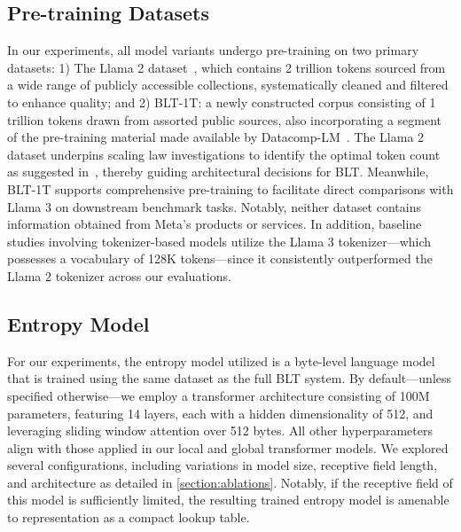 \subsection{Pre-training Datasets} In our experiments, all model variants undergo pre-training on two primary datasets: 1) The Llama 2 dataset~\citep{touvron2023llama}, which contains 2 trillion tokens sourced from a wide range of publicly accessible collections, systematically cleaned and filtered to enhance quality; and 2) {\textsc BLT}-1T: a newly constructed corpus consisting of 1 trillion tokens drawn from assorted public sources, also incorporating a segment of the pre-training material made available by Datacomp-LM~\citep{li2024datacomp}. The Llama 2 dataset underpins scaling law investigations to identify the optimal token count as suggested in~\cite{dubey2024llama}, thereby guiding architectural decisions for {\textsc BLT}. Meanwhile, {\textsc BLT}-1T supports comprehensive pre-training to facilitate direct comparisons with Llama 3 on downstream benchmark tasks. Notably, neither dataset contains information obtained from Meta’s products or services. In addition, baseline studies involving tokenizer-based models utilize the Llama 3 tokenizer—which possesses a vocabulary of 128K tokens—since it consistently outperformed the Llama 2 tokenizer across our evaluations.

\subsection{Entropy Model} For our experiments, the entropy model utilized is a byte-level language model that is trained using the same dataset as the full {\textsc BLT} system. By default—unless specified otherwise—we employ a transformer architecture consisting of 100M parameters, featuring 14 layers, each with a hidden dimensionality of 512, and leveraging sliding window attention over 512 bytes. All other hyperparameters align with those applied in our local and global transformer models. We explored several configurations, including variations in model size, receptive field length, and architecture as detailed in \autoref{section:ablations}. Notably, if the receptive field of this model is sufficiently limited, the resulting trained entropy model is amenable to representation as a compact lookup table.

